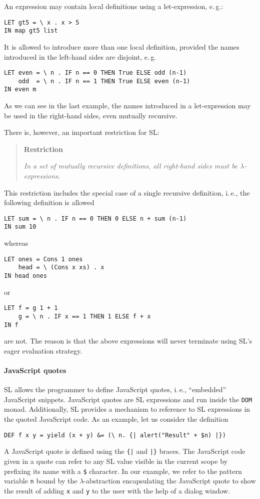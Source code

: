 \documentclass{article}
\begin{document}
An expression may contain local definitions using a let-expression,
e.\,g.:
\begin{verbatim}
LET gt5 = \ x . x > 5
IN map gt5 list
\end{verbatim}
It is allowed to introduce more than one local definition, provided
the names introduced in the left-hand sides are disjoint, e.\,g.
\begin{verbatim}
LET even = \ n . IF n == 0 THEN True ELSE odd (n-1)
    odd  = \ n . IF n == 1 THEN True ELSE even (n-1)
IN even m
\end{verbatim}
As we can see in the last example, the names introduced in a
let-expression may be used in the right-hand sides, even mutually
recursive.

There is, however, an important restriction for SL:
\begin{quote}
  \label{restriction}
  \textbf{Restriction}

\emph{In a set of mutually recursive definitions, all right-hand sides
  must be $\lambda$-expressions.}
\end{quote}

This restriction includes the special case of a single recursive
definition, i.\,e., the following definition is allowed
\begin{verbatim}
LET sum = \ n . IF n == 0 THEN 0 ELSE n + sum (n-1)
IN sum 10
\end{verbatim}
whereas
\begin{verbatim}
LET ones = Cons 1 ones
    head = \ (Cons x xs) . x
IN head ones
\end{verbatim}
or
\begin{verbatim}
LET f = g 1 + 1
    g = \ n . IF x == 1 THEN 1 ELSE f + x
IN f
\end{verbatim}
are not. The reason is that the above expressions will never terminate
using SL's eager evaluation strategy.


\paragraph{JavaScript quotes}
\label{sec:javascript-quotes}

SL allows the programmer to define JavaScript quotes, i.\,e.,
``embedded'' JavaScript snippets. JavaScript quotes are SL expressions
and run inside the \verb|DOM| monad. Additionally, SL provides a
mechanism to reference to SL expressions in the quoted JavaScript
code. As an example, let us consider the definition
\begin{verbatim}
DEF f x y = yield (x + y) &= (\ n. {| alert("Result" + $n) |})
\end{verbatim}
A JavaScript quote is defined using the \verb+{|+ and \verb+|}+
braces. The JavaScript code given in a quote can refer to any SL value
visible in the current scope by prefixing its name with a \verb|$|
character. In our example, we refer to the pattern variable \verb|n|
bound by the $\lambda$-abstraction encapsulating the JavaScript quote
to show the result of adding \verb|x| and \verb|y| to the user with
the help of a dialog window.
\end{document}
